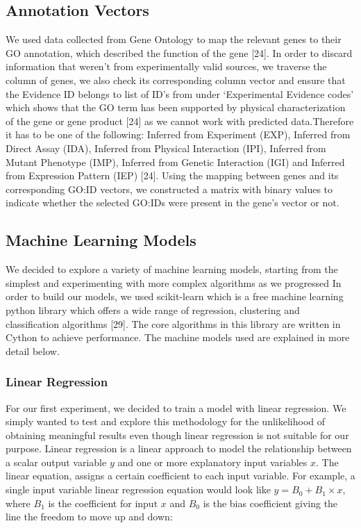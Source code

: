 \documentclass[9pt]{article}
\begin{document}
\subsection{Annotation Vectors}
We used data collected from Gene Ontology to map the relevant genes to their GO annotation, which described the function of the gene [24].
In order to discard information that weren’t from experimentally valid sources, we traverse the column of genes, we also check its corresponding column vector and ensure that the Evidence ID belongs to list of ID’s from under ‘Experimental Evidence codes’ which shows that the GO term has been supported by physical characterization of the gene or gene product [24] as we cannot work with predicted data.Therefore it has to be one of the following: Inferred from Experiment (EXP), Inferred from Direct Assay (IDA), Inferred from Physical Interaction (IPI), Inferred from Mutant Phenotype (IMP), Inferred from Genetic Interaction (IGI) and Inferred from Expression Pattern (IEP) [24]. Using the mapping between genes and its corresponding GO:ID vectors, we constructed a matrix with binary values to indicate whether the selected GO:IDs were present in the gene’s vector or not.

\subsection{Machine Learning Models}
We decided to explore a variety of machine learning models, starting from the simplest and experimenting with more complex algorithms as we progressed In order to build our models, we used scikit-learn which is a free machine learning python library which offers a wide range of regression, clustering and classification algorithms [29]. The core algorithms in this library are written in Cython to achieve performance. The machine models used are explained in more detail below. 

\subsubsection{Linear Regression}
For our first experiment, we decided to train a model with linear regression. We simply wanted to test and explore this methodology for the unlikelihood of obtaining meaningful results even though linear regression is not suitable for our purpose. Linear regression is a linear approach to model the relationship between a scalar output variable \(y\) and one or more explanatory input variables \(x\). The linear equation, assigns a certain coefficient to each input variable. For example, a single input variable linear regression equation would look like $y = B_0 + B_1\times{x}$, where \(B_1\) is the coefficient for input \(x\) and \(B_0\) is the bias coefficient giving the line the freedom to move up and down: 
\end{document}
